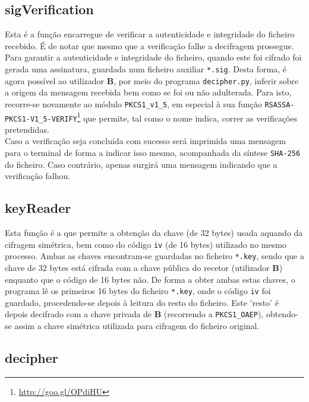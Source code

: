 \documentclass[a4paper,11pt,openright,oneside]{report}
\begin{document}
\subsection{sigVerification}

Esta é a função encarregue de verificar a autenticidade e integridade do ficheiro recebido. É de notar que mesmo que a verificação falhe a decifragem prossegue.\\

Para garantir a autenticidade e integridade do ficheiro, quando este foi cifrado foi gerada uma assinatura, guardada num ficheiro auxiliar \verb|*.sig|. Desta forma, é agora possível ao utilizador \textbf{B}, por meio do programa \verb|decipher.py|, inferir sobre a origem da mensagem recebida bem como se foi ou não adulterada. Para isto, recorre-se novamente ao módulo \verb|PKCS1_v1_5|, em especial à sua função \verb|RSASSA-PKCS1-V1_5-VERIFY|\footnote{\url{http://goo.gl/OPdiHU}} que permite, tal como o nome indica, correr as verificações pretendidas.\\

Caso a verificação seja concluída com sucesso será imprimida uma mensagem para o terminal de forma a indicar isso mesmo, acompanhada da síntese \verb|SHA-256| do ficheiro. Caso contrário, apenas surgirá uma mensagem indicando que a verificação falhou.

\subsection{keyReader}

Esta função é a que permite a obtenção da chave (de 32 bytes) usada aquando da cifragem simétrica, bem como do código \verb|iv| (de 16 bytes) utilizado no mesmo processo. Ambas as chaves encontram-se guardadas no ficheiro \verb|*.key|, sendo que a chave de 32 bytes está cifrada com a chave pública do recetor (utilizador \textbf{B}) enquanto que o código de 16 bytes não. De forma a obter ambas estas chaves, o programa lê os primeiros 16 bytes do ficheiro \verb|*.key|, onde o código \verb|iv| foi guardado, procedendo-se depois à leitura do resto do ficheiro. Este 'resto' é depois decifrado com a chave privada de \textbf{B} (recorrendo a \verb|PKCS1_OAEP|), obtendo-se assim a chave simétrica utilizada para cifragem do ficheiro original.

\subsection{decipher}
\end{document}
